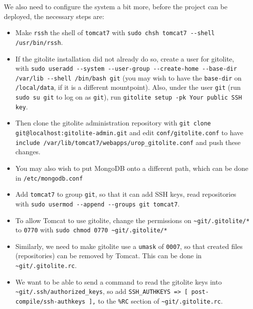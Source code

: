 \documentclass[12pt,a4paper]{article}
\newcommand{\gitoliteRc}{{\tt \~{}git/\hspace{0pt}.gitolite.rc}}
\newcommand{\gitoliteAuthkeys}{{\tt \~{}git/\hspace{0pt}.ssh/\hspace{0pt}authorized\_keys}}
\begin{document}
We also need to configure the system a bit more, before the project can be deployed, the necessary steps are:
\begin{itemize}
  \item Make {\tt rssh} the shell of {\tt tomcat7} with {\tt sudo chsh tomcat7 -{}-shell /usr/bin/rssh}.

  \item If the gitolite installation did not already do so, create a user for gitolite, with {\tt sudo useradd -{}-system -{}-user-group -{}-create-home -{}-base-dir /var/lib -{}-shell /bin/bash git} (you may wish to have the {\tt base-dir} on {\tt /local/data}, if it is a different mountpoint).
    Also, under the user {\tt git} (run {\tt sudo su git} to log on as {\tt git}), run {\tt gitolite setup -pk Your public SSH key}.

  \item Then clone the gitolite administration repository with {\tt git clone git@localhost:\hspace{0pt}gitolite-admin.git} and edit {\tt conf/gitolite.conf} to have {\tt include \textquotedbl{}/\hspace{0pt}var/\hspace{0pt}lib/\hspace{0pt}tomcat7/\hspace{0pt}webapps/\hspace{0pt}urop\_gitolite.conf\textquotedbl} and push these changes.

  \item You may also wish to put MongoDB onto a different path, which can be done in {\tt /etc/mongodb.conf}

  \item Add {\tt tomcat7} to group {\tt git}, so that it can add SSH keys, read repositories with {\tt sudo usermod -{}-append -{}-groups git tomcat7}.

  \item To allow Tomcat to use gitolite, change the permissions on {\tt \~{}git/.gitolite/*} to {\tt 0770} with {\tt sudo chmod 0770 \~{}git/.gitolite/*}

  \item Similarly, we need to make gitolite use a {\tt umask} of {\tt 0007}, so that created files (repositories) can be removed by Tomcat.
    This can be done in \gitoliteRc{}.

  \item We want to be able to send a command to read the gitolite keys into \gitoliteAuthkeys{}, so add {\tt SSH\_AUTHKEYS => [ \textquotesingle{}post-compile/ssh-authkeys\textquotesingle{} ],} to the {\tt \%RC} section of \gitoliteRc{}.


\end{itemize}
\end{document}
